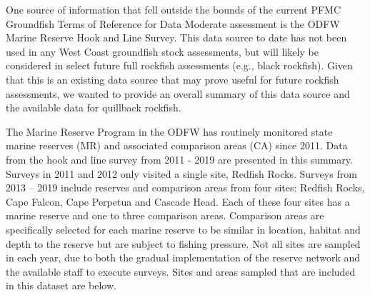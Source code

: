 \documentclass[11pt,
  english,
  a4paper,
]{article}
\begin{document}
\leavevmode\tagmcend\tagstructend


One source of information that fell outside the bounds of the current PFMC Groundfish Terms of Reference for Data Moderate assessment is the ODFW Marine Reserve Hook and Line Survey. This data source to date has not been used in any West Coast groundfish stock assessments, but will likely be considered in select future full rockfish assessments (e.g., black rockfish). Given that this is an existing data source that may prove useful for future rockfish assessments, we wanted to provide an overall summary of this data source and the available data for quillback rockfish.

\leavevmode\tagmcend\tagstructend\par


The Marine Reserve Program in the ODFW has routinely monitored state marine reserves (MR) and associated comparison areas (CA) since 2011. Data from the hook and line survey from 2011 - 2019 are presented in this summary. Surveys in 2011 and 2012 only visited a single site, Redfish Rocks. Surveys from 2013 -- 2019 include reserves and comparison areas from four sites: Redfish Rocks, Cape Falcon, Cape Perpetua and Cascade Head. Each of these four sites has a marine reserve and one to three comparison areas. Comparison areas are specifically selected for each marine reserve to be similar in location, habitat and depth to the reserve but are subject to fishing pressure. Not all sites are sampled in each year, due to both the gradual implementation of the reserve network and the available staff to execute surveys. Sites and areas sampled that are included in this dataset are below.

\leavevmode\tagmcend\tagstructend\par

\begingroup\fontsize{10}{12}\selectfont
\begingroup\fontsize{10}{12}\selectfont
\end{document}
